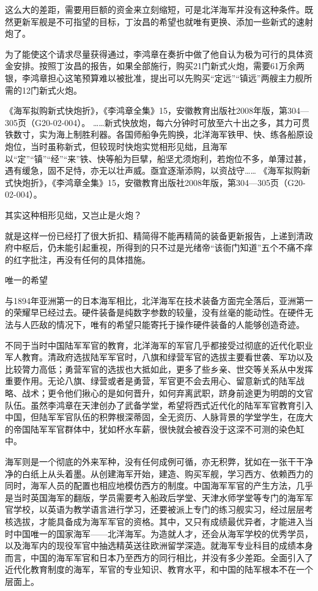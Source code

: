 \documentclass[12pt,UTF8]{ctexbook}
\begin{document}
这么大的差距，需要用巨额的资金来立刻缩短，可是北洋海军并没有这种条件。既然更新军舰是不可指望的目标，丁汝昌的希望也就唯有更换、添加一些新式的速射炮了。

为了能使这个请求尽量获得通过，李鸿章在奏折中做了他自认为极为可行的具体资金安排。按照丁汝昌的报告，如果全部施行，购买21门新式火炮，需要61万余两银，李鸿章担心这笔预算难以被批准，提出可以先购买“定远”“镇远”两艘主力舰所需的12门新式火炮。

《海军拟购新式快炮折》，《李鸿章全集》15，安徽教育出版社2008年版，第304—305页（G20-02-004）。
……新式快放炮，每六分钟时可放至六十出之多，其力可贯铁数寸，实为海上制胜利器。各国师船争先购换，北洋海军铁甲、快、练各船原设炮位，当时虽称新式，但较现时快炮实觉相形见绌，且海军以“定”“镇”“经”“来”铁、快等船为巨擘，船坚尤须炮利，若炮位不多，单薄过甚，遇有缓急，固不足恃，亦无以壮声威。亟宜逐渐添购，以资战守…… 《海军拟购新式快炮折》，《李鸿章全集》15，安徽教育出版社2008年版，第304—305页（G20-02-004）。

其实这种相形见绌，又岂止是火炮？

就是这样一份已经打了很大折扣、精简得不能再精简的装备更新报告，上递到清政府中枢后，仍未能引起重视，所得到的只不过是光绪帝“该衙门知道”五个不痛不痒的红字批注，再没有任何的具体措施。

唯一的希望

与1894年亚洲第一的日本海军相比，北洋海军在技术装备方面完全落后，亚洲第一的荣耀早已经过去。硬件装备是纯数字参数的较量，没有丝毫的能动性。在硬件无法与人匹敌的情况下，唯有的希望只能寄托于操作硬件装备的人能够创造奇迹。

不同于当时中国陆军军官的教育，北洋海军的军官几乎都接受过彻底的近代化职业军人教育。清政府选拔陆军军官时，八旗和绿营军官的选拔主要看世袭、军功以及比较膂力高低；勇营军官的选拔也大抵如此，更多了些乡亲、世交等关系从中发挥重要作用。无论八旗、绿营或者是勇营，军官更不会去用心、留意新式的陆军战略、战术；更令他们揪心的是如何晋升，如何弃离武职，跻身前途更为明朗的文官队伍。虽然李鸿章在天津创办了武备学堂，希望将西式近代化的陆军军官教育引入中国，但陆军军官队伍的积弊根深蒂固，全无资历、人脉背景的学堂学生，在庞大的帝国陆军军官群体中，犹如杯水车薪，很快就会被吞没于这深不可测的染色缸中。

海军则是一个彻底的外来军种，没有任何成例可循，亦无积弊，犹如在一张干干净净的白纸上从头着墨。从创建海军开始，建造、购买军舰，学习西方、依赖西力的同时，海军人员的配置也相应地模仿西方的制度。中国海军军官的产生方法，几乎是当时英国海军的翻版，学员需要考入船政后学堂、天津水师学堂等专门的海军军官学校，以英语为教学语言进行学习，还要被派上专门的练习舰实习，经过层层考核选拔，才能具备成为海军军官的资格。其中，又只有成绩最优异者，才能进入当时中国唯一的国家海军——北洋海军。为造就人才，还会从海军学校的优秀学员，以及海军内的现役军官中抽选精英送往欧洲留学深造。就海军专业科目的成绩本身而言，中国的海军军官和日本乃至西方的同行相比，并没有多少差距。全面引入了近代化教育制度的海军，军官的专业知识、教育水平，和中国的陆军根本不在一个层面上。
\end{document}
